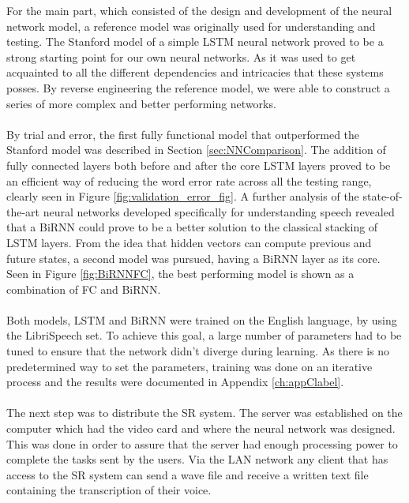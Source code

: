 For the main part, which consisted of the design and development of the neural network model, a reference model was originally used for understanding and testing. The Stanford model of a simple LSTM neural network proved to be a strong starting point for our own neural networks. As it was used to get acquainted to all the different dependencies and intricacies that these systems posses. By reverse engineering the reference model, we were able to construct a series of more complex and better performing networks.\\\\ 
By trial and error, the first fully functional model that outperformed the Stanford model was described in Section \ref{sec:NNComparison}. The addition of fully connected layers both before and after the core LSTM layers proved to be an efficient way of reducing the word error rate across all the testing range, clearly seen in Figure \ref{fig:validation_error_fig}. A further analysis of the state-of-the-art neural networks developed specifically for understanding speech revealed that a BiRNN could prove to be a better solution to the classical stacking of LSTM layers. From the idea that hidden vectors can compute previous and future states, a second model was pursued, having a BiRNN layer as its core. Seen in Figure \ref{fig:BiRNNFC}, the best performing model is shown as a combination of FC and BiRNN. \\\\
Both models, LSTM and BiRNN were trained on the English language, by using the LibriSpeech set. To achieve this goal, a large number of parameters had to be tuned to ensure that the network didn't diverge during learning. As there is no predetermined way to set the parameters, training was done on an iterative process and the results were documented in Appendix \ref{ch:appClabel}.\\\\
The next step was to distribute the SR system. The server was established on the computer which had the video card and where the neural network was designed. This was done in order to assure that the server had enough processing power to complete the tasks sent by the users. Via the LAN network any client that has access to the SR system can send a wave file and receive a written text file containing the transcription of their voice.


